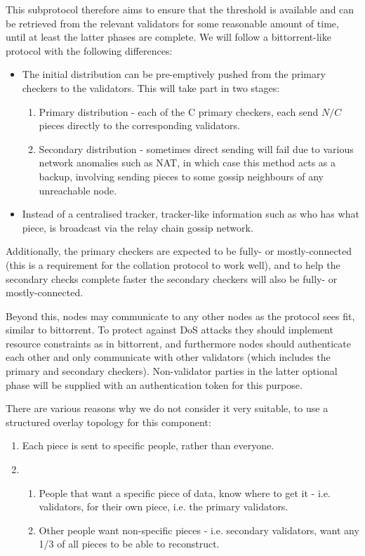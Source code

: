 This subprotocol therefore aims to ensure that the threshold is available and can be retrieved from the relevant validators for some reasonable amount of time, until at least the latter phases are complete. We will follow a bittorrent-like protocol with the following differences:

\begin{itemize}
\item The initial distribution can be pre-emptively pushed from the primary checkers to the validators. This will take part in two stages:
\begin{enumerate}
\item Primary distribution - each of the C primary checkers, each send $N/C$ pieces directly to the corresponding validators.
\item Secondary distribution - sometimes direct sending will fail due to various network anomalies such as NAT, in which case this method acts as a backup, involving sending pieces to some gossip neighbours of any unreachable node.
\end{enumerate}
\item Instead of a centralised tracker, tracker-like information such as who has what piece, is broadcast via the relay chain gossip network.
\end{itemize}

Additionally, the primary checkers are expected to be fully- or mostly-connected (this is a requirement for the collation protocol to work well), and to help the secondary checks complete faster the secondary checkers will also be fully- or mostly-connected.

Beyond this, nodes may communicate to any other nodes as the protocol sees fit, similar to bittorrent. To protect against DoS attacks they should implement resource constraints as in bittorrent, and furthermore nodes should authenticate each other and only communicate with other validators (which includes the primary and secondary checkers). Non-validator parties in the latter optional phase will be supplied with an authentication token for this purpose.

There are various reasons why we do not consider it very suitable, to use a
structured overlay topology for this component:

\begin{enumerate}
\item Each piece is sent to specific people, rather than everyone.
\item
\begin{enumerate}
\item People that want a specific piece of data, know where to get it - i.e.
      validators, for their own piece, i.e. the primary validators.
\item Other people want non-specific pieces - i.e. secondary validators,
      want any 1/3 of all pieces to be able to reconstruct.
\end{enumerate}
\end{enumerate}


